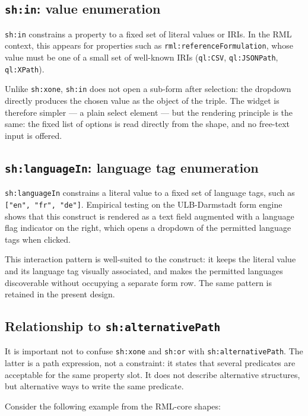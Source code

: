 \subsection{\texttt{sh:in}: value enumeration}

\texttt{sh:in} constrains a property to a fixed set of literal values or IRIs.
In the RML context, this appears for properties such as \texttt{rml:referenceFormulation}, whose value must be one of a small set of well-known IRIs (\texttt{ql:CSV}, \texttt{ql:JSONPath}, \texttt{ql:XPath}).

Unlike \texttt{sh:xone}, \texttt{sh:in} does not open a sub-form after selection: the dropdown directly produces the chosen value as the object of the triple.
The widget is therefore simpler --- a plain select element --- but the rendering principle is the same: the fixed list of options is read directly from the shape, and no free-text input is offered.

\subsection{\texttt{sh:languageIn}: language tag enumeration}

\texttt{sh:languageIn} constrains a literal value to a fixed set of language tags, such as \texttt{["en", "fr", "de"]}.
Empirical testing on the ULB-Darmstadt form engine shows that this construct is rendered as a text field augmented with a language flag indicator on the right, which opens a dropdown of the permitted language tags when clicked.

This interaction pattern is well-suited to the construct: it keeps the literal value and its language tag visually associated, and makes the permitted languages discoverable without occupying a separate form row.
The same pattern is retained in the present design.

\subsection{Relationship to \texttt{sh:alternativePath}}

It is important not to confuse \texttt{sh:xone} and \texttt{sh:or} with \texttt{sh:alternativePath}.
The latter is a path expression, not a constraint: it states that several predicates are acceptable for the same property slot.
It does not describe alternative structures, but alternative ways to write the same predicate.

Consider the following example from the RML-core shapes:

